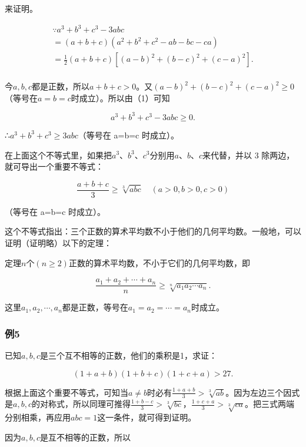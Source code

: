 来证明。


\[
\begin{array}{l} \because a^{3} + b^{3} + c^{3} - 3 a b c \\ = (a + b + c) \left(a^{2} + b^{2} + c^{2} - a b - b c - c a\right) \\ = \frac{1}{2} (a + b + c) [ (a - b)^{2} + (b - c)^{2} + (c - a)^{2} ]. \tag {1} \\ \end{array}
\]

今\(a, b, c\)都是正数，所以\(a + b + c > 0\)。又\((a - b)^2 + (b - c)^2 + (c - a)^2 \geqslant 0\)（等号在\(a = b = c\)时成立）。所以由（1）可知

\[
a^{3} + b^{3} + c^{3} - 3 a b c \geqslant 0.
\]

∴\(a^{3}+b^{3}+c^{3}\geqslant3abc\)（等号在 a=b=c 时成立）。

在上面这个不等式里，如果把\(a^3\)、\(b^3\)、\(c^3\)分别用\(a\)、\(b\)、\(c\)来代替，并以
3 除两边，就可导出一个重要不等式：

\[
\frac{a + b + c}{3} \geqslant \sqrt[3]{a b c} \quad (a > 0, b > 0, c > 0)
\]

（等号在 a=b=c 时成立）。

这个不等式指出：三个正数的算术平均数不小于他们的几何平均数。一般地，可以证明（证明略）以下的定理：

定理\(n\)个\((n \geqslant 2)\)正数的算术平均数，不小于它们的几何平均数，即

\[
\frac{a_{1} + a_{2} + \cdots + a_{n}}{n} \geqslant \sqrt[n]{a_{1} a_{2} \cdots a_{n}}.
\]

这里\(a_{1}, a_{2}, \cdots, a_{n}\)都是正数，等号在\(a_{1}=a_{2}=\cdots=a_{n}\)时成立。

\subsubsection{例5}

已知\(a, b, c\)是三个互不相等的正数，他们的乘积是1，求证：

\[
(1 + a + b) (1 + b + c) (1 + c + a) > 27.
\]

根据上面这个重要不等式，可知当\(a \neq b\)时必有\(\frac{1 + a + b}{3} > \sqrt[3]{ab}\)。因为左边三个因式是\(a, b, c\)的对称式，所以同理可推得\(\frac{1 + b - c}{3} > \sqrt[3]{bc}\)，\(\frac{1 + c + a}{3} > \sqrt[3]{ca}\)。把三式两端分别相乘，再应用\(abc = 1\)这一条件，就可得到证明。

 因为\(a, b, c\)是互不相等的正数，所以

